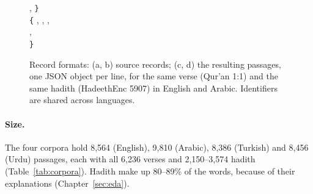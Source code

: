 \begin{figure}[ht]
{\begin{minipage}{0.97\textwidth}
\hspace*{1em} ,  \texttt{\}}\\[2pt]
\texttt{\{} ,  ,  ,\\
\hspace*{1em} ,\\
\hspace*{1em} \texttt{\}}
\end{minipage}}
\caption{Record formats: (a, b) source records; (c, d) the resulting passages, one JSON object per line, for the same
verse (Qur'an 1:1) and the same hadith (HadeethEnc 5907) in English and Arabic. Identifiers are shared across languages.}
\label{fig:json}
\end{figure}

\paragraph{Size.} The four corpora hold 8,564 (English), 9,810 (Arabic), 8,386 (Turkish) and 8,456 (Urdu) passages,
each with all 6,236 verses and 2,150--3,574 hadith (Table~\ref{tab:corpora}). Hadith make up 80--89\% of the words,
because of their explanations (Chapter~\ref{sec:eda}).
